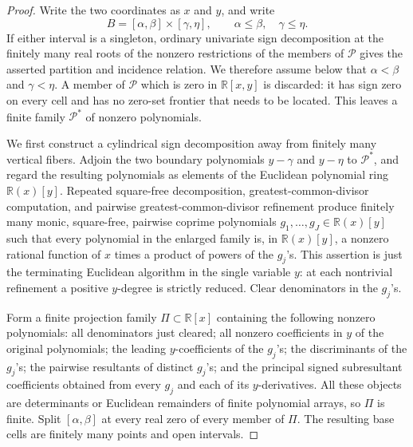 \documentclass{article}
\begin{document}
\begin{proof}
Write the two coordinates as \(x\) and \(y\), and write
\[
B=[\alpha,\beta]\times[\gamma,\eta],
\qquad \alpha\leq\beta,\quad \gamma\leq\eta.
\]
If either interval is a singleton, ordinary univariate sign decomposition at the finitely many real roots of the nonzero restrictions of the members of \(\mathscr P\) gives the asserted partition and incidence relation.  We therefore assume below that \(\alpha<\beta\) and \(\gamma<\eta\).  A member of \(\mathscr P\) which is zero in \(\mathbb R[x,y]\) is discarded: it has sign zero on every cell and has no zero-set frontier that needs to be located.  This leaves a finite family \(\mathscr P^{*}\) of nonzero polynomials.

We first construct a cylindrical sign decomposition away from finitely many vertical fibers.  Adjoin the two boundary polynomials \(y-\gamma\) and \(y-\eta\) to \(\mathscr P^{*}\), and regard the resulting polynomials as elements of the Euclidean polynomial ring \(\mathbb R(x)[y]\).  Repeated square-free decomposition, greatest-common-divisor computation, and pairwise greatest-common-divisor refinement produce finitely many monic, square-free, pairwise coprime polynomials \(g_1,\ldots,g_J\in\mathbb R(x)[y]\) such that every polynomial in the enlarged family is, in \(\mathbb R(x)[y]\), a nonzero rational function of \(x\) times a product of powers of the \(g_j\)'s.  This assertion is just the terminating Euclidean algorithm in the single variable \(y\): at each nontrivial refinement a positive \(y\)-degree is strictly reduced.  Clear denominators in the \(g_j\)'s.

Form a finite projection family \(\Pi\subset\mathbb R[x]\) containing the following nonzero polynomials: all denominators just cleared; all nonzero coefficients in \(y\) of the original polynomials; the leading \(y\)-coefficients of the \(g_j\)'s; the discriminants of the \(g_j\)'s; the pairwise resultants of distinct \(g_j\)'s; and the principal signed subresultant coefficients obtained from every \(g_j\) and each of its \(y\)-derivatives.  All these objects are determinants or Euclidean remainders of finite polynomial arrays, so \(\Pi\) is finite.  Split \([\alpha,\beta]\) at every real zero of every member of \(\Pi\).  The resulting base cells are finitely many points and open intervals.


\end{proof}
\end{document}
